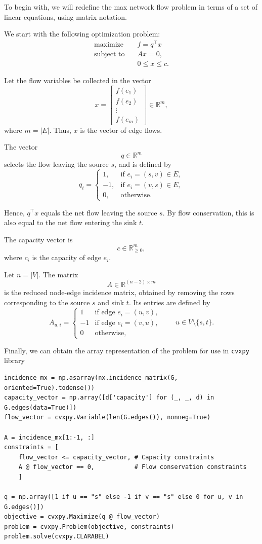 \documentclass[12pt, openany]{article}
\begin{document}
To begin with, we will redefine the max network flow problem in terms of a set of linear equations, using matrix notation.


We start with the following optimization problem:
\[
\begin{aligned}
\text{maximize} \quad & f = q^\top x \\[4pt]
\text{subject to} \quad
& Ax = 0, \\[4pt]
& 0 \le x \le c .
\end{aligned}
\]

Let the flow variables be collected in the vector
\[
x=
\begin{bmatrix}
f(e_1)\\
f(e_2)\\
\vdots\\
f(e_m)
\end{bmatrix}
\in\mathbb{R}^m,
\]
where \(m=|E|\). Thus, \(x\) is the vector of edge flows.

The vector
\[
q \in \mathbb{R}^m
\]
selects the flow leaving the source \(s\), and is defined by
\[
q_i =
\begin{cases}
1, & \text{if } e_i=(s,v)\in E, \\[4pt]
-1, & \text{if } e_i=(v,s)\in E, \\[4pt]
0, & \text{otherwise.}
\end{cases}
\]

Hence, \(q^\top x\) equals the net flow leaving the source \(s\). By flow conservation, this is also equal to the net flow entering the sink \(t\).

The capacity vector is
\[
c \in \mathbb{R}_{\ge 0}^m,
\]
where \(c_i\) is the capacity of edge \(e_i\).

Let \(n=|V|\). The matrix
\[
A \in \mathbb{R}^{(n-2)\times m}
\]
is the reduced node-edge incidence matrix, obtained by removing the rows corresponding to the source \(s\) and sink \(t\). Its entries are defined by
\[
A_{u,i} =
\begin{cases}
1 & \text{if edge } e_i=(u,v), \\
-1 & \text{if edge } e_i=(v,u), \\
0 & \text{otherwise,}
\end{cases}
\qquad u \in V\setminus\{s,t\}.
\]

Finally, we can obtain the array representation of the problem for use in \texttt{cvxpy} library

\begin{verbatim}
incidence_mx = np.asarray(nx.incidence_matrix(G, oriented=True).todense())
capacity_vector = np.array([d['capacity'] for (_, _, d) in G.edges(data=True)])
flow_vector = cvxpy.Variable(len(G.edges()), nonneg=True)

A = incidence_mx[1:-1, :]
constraints = [
    flow_vector <= capacity_vector, # Capacity constraints
    A @ flow_vector == 0,           # Flow conservation constraints
    ]

q = np.array([1 if u == "s" else -1 if v == "s" else 0 for u, v in G.edges()])
objective = cvxpy.Maximize(q @ flow_vector)
problem = cvxpy.Problem(objective, constraints)
problem.solve(cvxpy.CLARABEL)
\end{verbatim}
\end{document}
